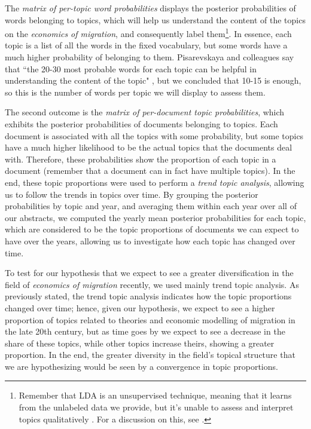 The \textit{matrix of per-topic word probabilities} displays the posterior probabilities of words belonging to topics, which will help us understand the content of the topics on the \textit{economics of migration}, and consequently label them\footnote{Remember that LDA is an unsupervised technique, meaning that it learns from the unlabeled data we provide, but it's unable to assess and interpret topics qualitatively \citep{evans_machine_2016}. For a discussion on this, see \cite{chang_reading_2009}.}. In essence, each topic is a list of all the words in the fixed vocabulary, but some words have a much higher probability of belonging to them. Pisarevskaya and colleagues say that ``the 20-30 most probable words for each topic can be helpful in understanding the content of the topic" \citep[p. 460]{pisarevskaya_mapping_2020}, but we concluded that 10-15 is enough, so this is the number of words per topic we will display to assess them.

The second outcome is the \textit{matrix of per-document topic probabilities}, which exhibits the posterior probabilities of documents belonging to topics. Each document is associated with all the topics with some probability, but some topics have a much higher likelihood to be the actual topics that the documents deal with. Therefore, these probabilities show the proportion of each topic in a document (remember that a document can in fact have multiple topics). In the end, these topic proportions were used to perform a \textit{trend topic analysis}, allowing us to follow the trends in topics over time. By grouping the posterior probabilities by topic and year, and averaging them within each year over all of our abstracts, we computed the yearly mean posterior probabilities for each topic, which are considered to be the topic proportions of documents we can expect to have over the years, allowing us to investigate how each topic has changed over time.

To test for our hypothesis that we expect to see a greater diversification in the field of \textit{economics of migration} recently, we used mainly trend topic analysis. As previously stated, the trend topic analysis indicates how the topic proportions changed over time; hence, given our hypothesis, we expect to see a higher proportion of topics related to theories and economic modelling of migration in the late 20th century, but as time goes by we expect to see a decrease in the share of these topics, while other topics increase theirs, showing a greater proportion. In the end, the greater diversity in the field's topical structure that we are hypothesizing would be seen by a convergence in topic proportions. 

